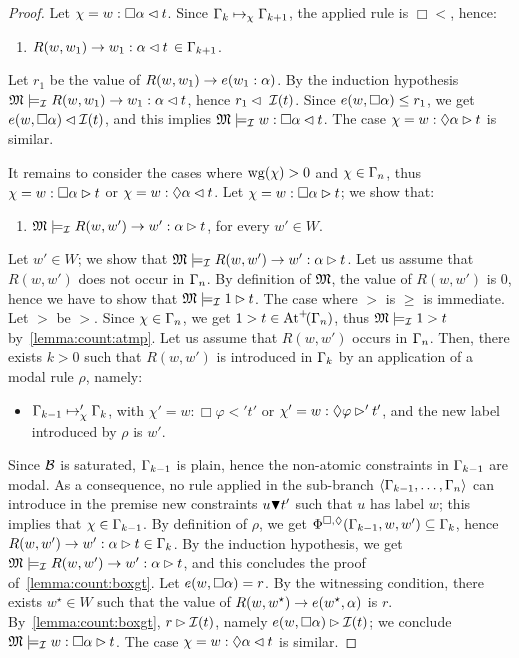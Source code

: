 \begin{proof}
 Let $\chi= w:\Box\a\lt t$.  Since $\app{\chi}{\G_k}{\G_{k+1}}$, the
 applied rule is $\Box\lt$, hence:
 \begin{enumerate}[label=(\Alph*), ref=(\Alph*),leftmargin=*,start=4]
   
 \item\label{lemma:count:boxlt}
   $R(w,w_1)\to w_1:\a\lt t \, \in \G_{k+1}$.
 \end{enumerate}
 Let $r_1$ be the value of $R(w,w_1)\to e(w_1:\a)$.  By the induction
 hypothesis $\M\models_\Ical R(w,w_1)\to w_1:\a\lt t $, hence $r_1\lt\
 \Ical(t)$.  Since $e(w,\Box\a)\leq r_1$, we get $e(w,\Box\a) \lt
 \Ical(t)$, and this implies $\M\models_\Ical w:\Box\a\lt t$.  The
 case $\chi= w:\Diam\a\gt t$ is similar.

 It remains to consider the cases where $\wg{\chi}>0$ and $\chi\in
 \G_n$, thus $\chi= w:\Box\a\gt t$ or $\chi= w:\Diam\a\lt t$.  Let
 $\chi= w:\Box\a\gt t$; we show that:

 \begin{enumerate}[label=(\Alph*), ref=(\Alph*),leftmargin=*,start=5]
 \item\label{lemma:count:boxgt}
   $\M\models_\Ical R(w,w') \to w':\a\gt t$, for every  $w'\in W$.
 \end{enumerate}
 Let $w'\in W$; we show that $\M\models_\Ical R(w,w') \to w':\a\gt t$.
 Let us assume that $R(w,w')$ does not occur in $\G_n$.  By definition
 of $\M$, the value of $R(w,w')$ is 0, hence we have to show that
 $\M\models_\Ical 1 \gt t$.  The case where $\gt$ is $\geq$ is
 immediate.  Let $\gt$ be $>$.  Since $\chi\in\G_n$, we get $1
 >t\in\Atmp{\G_n}$, thus $\M\models_\Ical1 > t$
 by~\ref{lemma:count:atmp}.  Let us assume that $R(w,w')$ occurs in
 $\G_n$.  Then, there exists $k > 0$ such that $R(w,w')$ is
 introduced in $\G_{k}$ by an application of a modal rule $\rho$,
 namely:
 \begin{itemize}
 \item $\app{\chi'}{\G_{k-1}}{\G_k}$, with $\chi' = w :\Box \varphi \lt' t'$ 
   or  $\chi' = w :\Diam\varphi \gt' t'$,
   and the new label introduced by $\rho$ is  $w'$.
 \end{itemize}
 Since $\Bcal$ is saturated, $\G_{k-1}$ is plain, hence the non-atomic
 constraints in $\G_{k-1}$ are modal.  As a consequence, no rule
 applied in the sub-branch $\stru{\G_{k-1},\dots,\G_n}$ can introduce
 in the premise new constraints $u\abstractorder t'$ such that $u$ has
 label $w$; this implies that $\chi\in \G_{k-1}$.  By definition of
 $\rho$, we get $\Phibd{\G_{k-1},w,w'}\subseteq \G_{k}$, hence
 $R(w,w') \to w':\a\gt t \in\G_{k}$. By the induction hypothesis, we
 get $\M\models_\Ical R(w,w') \to w':\a\gt t$, and this concludes the
 proof of~\ref{lemma:count:boxgt}.  Let $e(w,\Box\a)=r$.  By the witnessing condition,
  there exists $w^\star\in W$ such that the value of
 $R(w,w^\star) \to e(w^\star,\a)$ is $r$.  By~\ref{lemma:count:boxgt},
 $r\gt \Ical(t)$, namely $e(w,\Box\a)\gt \Ical(t)$; we conclude
 $\M\models_\Ical w:\Box\a\gt t$.  The case $\chi= w:\Diam\a\lt t$ is
 similar.
\end{proof}


